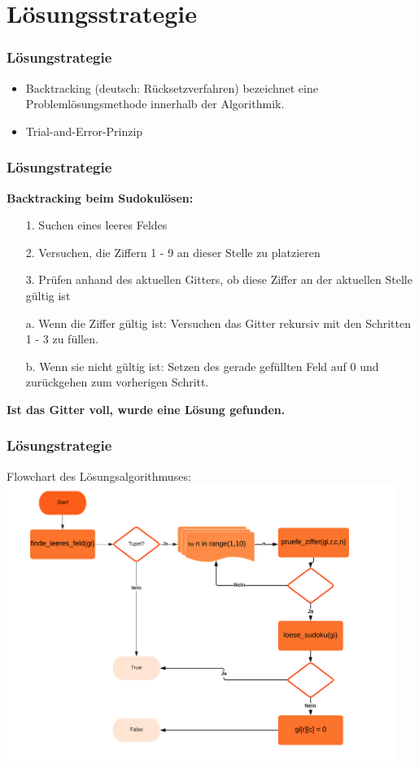 \documentclass{beamer}
\begin{document}
\section{Lösungsstrategie}
\begin{frame}
	\frametitle{Lösungstrategie} 
	\begin{itemize}
		\item Backtracking (deutsch: Rücksetzverfahren) bezeichnet eine Problemlösungsmethode innerhalb der Algorithmik. 
		\item Trial-and-Error-Prinzip
	\end{itemize}
\end{frame}

\begin{frame}
	\frametitle{Lösungstrategie} 

	\textbf{Backtracking beim Sudokulösen:}
	
	\begin{itemize}
		\item [1.] Suchen eines leeres Feldes
\item [2.] Versuchen, die Ziffern 1 - 9 an dieser Stelle zu platzieren
	\item [3.] Prüfen anhand des aktuellen Gitters, ob diese Ziffer an der aktuellen Stelle gültig ist
	\item [a.] Wenn die Ziffer gültig ist: Versuchen das Gitter rekursiv mit den Schritten 1 - 3 zu füllen.
	\item [b.] Wenn sie nicht gültig ist: Setzen des gerade gefüllten Feld auf 0 und zurückgehen zum vorherigen Schritt.
	\end{itemize}
	\textbf{Ist das Gitter voll, wurde eine Lösung gefunden.}
\end{frame}

\begin{frame}
	\frametitle{Lösungstrategie} 
	Flowchart des Lösungsalgorithmuses:
		\centering
	\includegraphics[width=0.95\textwidth]{img/flow.png}
\end{frame}
\end{document}
